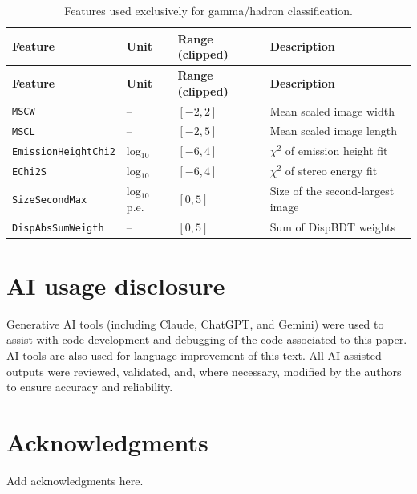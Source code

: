 \documentclass[12pt]{article}
\begin{document}
\begin{longtable}{lll p{5.5cm}}
\caption{Features used exclusively for gamma/hadron classification.} \label{tab:features-class} \\
\hline
\textbf{Feature} & \textbf{Unit} & \textbf{Range (clipped)} & \textbf{Description} \\
\hline
\endfirsthead
\hline
\textbf{Feature} & \textbf{Unit} & \textbf{Range (clipped)} & \textbf{Description} \\
\hline
\endhead
\hline
\endfoot
\texttt{MSCW} & -- & $[-2,2]$ & Mean scaled image width \\
\texttt{MSCL} & -- & $[-2,5]$ & Mean scaled image length \\
\texttt{EmissionHeightChi2} & log$_{10}$ & $[-6,4]$ & $\chi^2$ of emission height fit \\
\texttt{EChi2S} & log$_{10}$ & $[-6,4]$ & $\chi^2$ of stereo energy fit \\
\texttt{SizeSecondMax} & log$_{10}$ p.e. & $[0,5]$ & Size of the second-largest image \\
\texttt{DispAbsSumWeigth} & -- & $[0,5]$ & Sum of DispBDT weights \\
\end{longtable}

\section*{AI usage disclosure}

Generative AI tools (including Claude, ChatGPT, and Gemini) were used to assist
with code development and debugging of the code associated to this paper.
AI tools are also used for language improvement of this text.
All AI-assisted outputs were reviewed, validated, and, where necessary,
modified by the authors to ensure accuracy and reliability.

\section*{Acknowledgments}

Add acknowledgments here.


%
\end{document}
